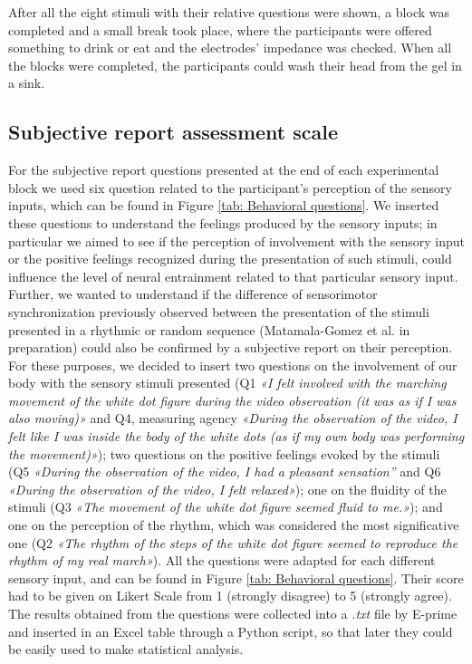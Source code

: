 After all the eight stimuli with their relative questions were shown, a block was completed and a small break took place, where the participants were offered something to drink or eat and the electrodes' impedance was checked. 
When all the blocks were completed, the participants could wash their head from the gel in a sink.

\subsection*{Subjective report assessment scale}
For the subjective report questions presented at the end of each experimental block we used six question related to the participant's perception of the sensory inputs, which can be found in Figure \ref{tab: Behavioral questions}. 
We inserted these questions to understand the feelings produced by the sensory inputs; in particular we aimed to see if the perception of involvement with the sensory input or the positive feelings recognized during the presentation of such stimuli, could influence the level of neural entrainment related to that particular sensory input. Further, we wanted to understand if the difference of sensorimotor synchronization previously observed between the presentation of the stimuli presented in a rhythmic or random sequence (Matamala-Gomez et al. in preparation) could also be confirmed by a subjective report on their perception. 
For these purposes, we decided to insert two questions on the involvement of our body with the sensory stimuli presented (Q1 \textit{«I felt involved with the marching movement of the white dot figure during the video observation (it was as if I was also moving)»} and Q4, measuring agency \textit{«During the observation of the video, I felt like I was inside the body of the white dots (as if my own body was performing the movement)»}); two questions on the positive feelings evoked by the stimuli (Q5 \textit{«During the observation of the video, I had a pleasant sensation”} and Q6 \textit{«During the observation of the video, I felt relaxed»}); one on the fluidity of the stimuli (Q3 \textit{«The movement of the white dot figure seemed fluid to me.»}); and one on the perception of the rhythm, which was considered the most significative one (Q2 \textit{«The rhythm of the steps of the white dot figure seemed to reproduce the rhythm of my real march»}). 
All the questions were adapted for each different sensory input, and can be found in Figure \ref{tab: Behavioral questions}. 
Their score had to be given on Likert Scale from 1 (strongly disagree) to 5 (strongly agree). The results obtained from the questions were collected into a \textit{.txt} file by E-prime and inserted in an Excel table through a Python script, so that later they could be easily used to make statistical analysis. 
